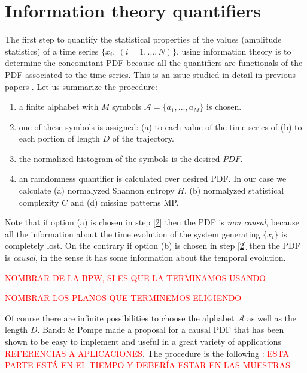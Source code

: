 \section{Information theory quantifiers}\label{sec:quant}

The first step to quantify the statistical properties of the values (amplitude statistics) of a time series $\{x_i,~(i=1,...,N)\}$, using information theory is to determine the concomitant PDF because all the quantifiers are functionals of the PDF associated to the time series. This is an issue studied in detail in previous papers \cite{aka varios}. Let us summarize the procedure:

\begin{enumerate} 
\item \label{1} a finite alphabet with $M$ symbols $\mathcal{A}=\{a_1,...,a_M\}$ is chosen. 
\item \label{2} one of these symbols is assigned: (a) to each value of the time series of (b) to each portion of length $D$ of the trajectory. 
\item \label{3} the normalized histogram of the symbols is the desired $PDF$.
\item \label{3} an ramdomness quantifier is calculated over desired PDF. In our case we calculate (a) normalyzed Shannon entropy $H$, (b) normalyzed statistical complexity $C$ and (d) missing patterns MP.
\end{enumerate}

Note that if option (a) is chosen in step \ref{2} then the PDF is \textit{non causal}, because all the information about the time evolution of the system generating $\{x_i\}$ is completely lost.
On the contrary if option (b) is chosen in step \ref{2} then the PDF is \textit{causal}, in the sense it has some information about the temporal evolution.

\textcolor{red}{NOMBRAR DE LA BPW, SI ES QUE LA TERMINAMOS USANDO}

\textcolor{red}{NOMBRAR LOS PLANOS QUE TERMINEMOS ELIGIENDO}

Of course there are infinite possibilities to choose the alphabet $\mathcal{A}$ as well as the length $D$.
Bandt \& Pompe made a proposal for a causal PDF that has been shown to be easy to implement and useful in a great variety of applications \textcolor{red}{REFERENCIAS A APLICACIONES}.
The procedure is the following \cite{Pompe2002,Keller2003,Keller2005}: \textcolor{red}{ESTA PARTE ESTÁ EN EL TIEMPO Y DEBERÍA ESTAR EN LAS MUESTRAS}

